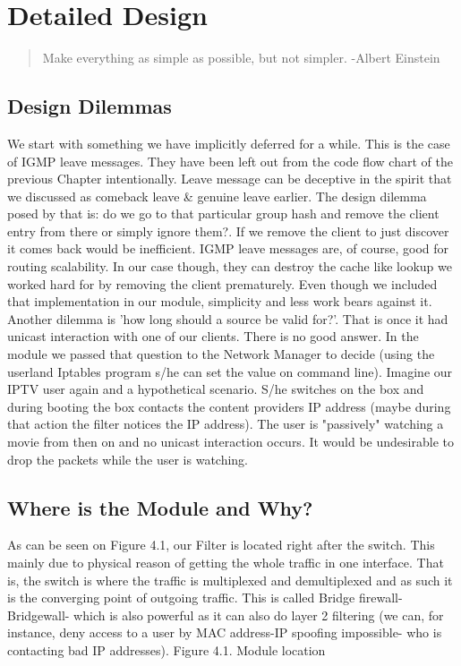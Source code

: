 \chapter{Detailed Design}
\begin{quote}
Make everything as simple as possible, but not simpler.
-Albert Einstein\end{quote}
\section{Design Dilemmas}
We start with something we have implicitly deferred for a while. This is the
case of IGMP leave messages. They have been left out from the code flow chart of
the previous Chapter intentionally. Leave message can be deceptive in the spirit
that we discussed as comeback leave \& genuine leave earlier. The design dilemma
posed by that is: do we go to that particular group hash and remove the client
entry from there or simply ignore them?. If we remove the client to just discover
it comes back would be inefficient. IGMP leave messages are, of course, good for
routing scalability. In our case though, they can destroy the cache like lookup 
we worked hard for by removing the client prematurely. Even though we included
that implementation in our module, simplicity and less work bears against it.
Another dilemma is 'how long should a source be valid for?'. That is once it had
unicast interaction with one of our clients. There is no good answer. In the module
we passed that question to the Network Manager to decide (using the userland
Iptables program s/he can set the value on command line). Imagine our IPTV user
again and a hypothetical scenario. S/he switches on the box and during booting
the box contacts the content providers IP address (maybe during that action the
filter notices the  IP address). The user is "passively" watching a movie
from then on and no unicast interaction occurs. It would be undesirable to drop
the packets while the user is watching.
\section{Where is the Module and Why?}
As can be seen on Figure 4.1, our Filter is located right after the switch. This
mainly due to physical reason of getting the whole traffic in one interface. That is,
the switch is where the traffic is multiplexed and demultiplexed and as such it is
the converging point of outgoing traffic. This is called Bridge firewall- Bridgewall-
which is also powerful as it can also do layer 2 filtering (we can, for instance, deny
access to a user by MAC address-IP spoofing impossible- who is contacting bad IP
addresses).
Figure 4.1. Module location
